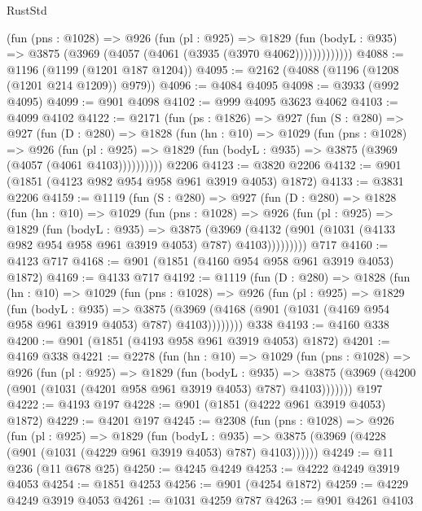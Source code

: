 \begin{lexlean}{RustStd}
\begin{coremodule}
              (fun (pns : @1028) =>
              @926
                (fun (pl : @925) =>
                @1829
                  (fun (bodyL : @935) => @3875 (@3969 (@4057 (@4061 (@3935 (@3970 @4062)))))))))))))
@4088 := @1196 (@1199 (@1201 @187 @1204))
@4095 := @2162 (@4088 (@1196 (@1208 (@1201 @214 @1209)) @979))
@4096 := @4084 @4095
@4098 := @3933 (@992 @4095)
@4099 := @901 @4098
@4102 := @999 @4095 @3623 @4062
@4103 := @4099 @4102
@4122 := @2171
    (fun (ps : @1826) =>
    @927
      (fun (S : @280) =>
      @927
        (fun (D : @280) =>
        @1828
          (fun (hn : @10) =>
          @1029
            (fun (pns : @1028) =>
            @926
              (fun (pl : @925) =>
              @1829 (fun (bodyL : @935) => @3875 (@3969 (@4057 (@4061 @4103))))))))))
    @2206
@4123 := @3820 @2206
@4132 := @901 (@1851 (@4123 @982 @954 @958 @961 @3919 @4053) @1872)
@4133 := @3831 @2206
@4159 := @1119
    (fun (S : @280) =>
    @927
      (fun (D : @280) =>
      @1828
        (fun (hn : @10) =>
        @1029
          (fun (pns : @1028) =>
          @926
            (fun (pl : @925) =>
            @1829
              (fun (bodyL : @935) =>
              @3875
                (@3969
                  (@4132 (@901 (@1031 (@4133 @982 @954 @958 @961 @3919 @4053) @787) @4103)))))))))
    @717
@4160 := @4123 @717
@4168 := @901 (@1851 (@4160 @954 @958 @961 @3919 @4053) @1872)
@4169 := @4133 @717
@4192 := @1119
    (fun (D : @280) =>
    @1828
      (fun (hn : @10) =>
      @1029
        (fun (pns : @1028) =>
        @926
          (fun (pl : @925) =>
          @1829
            (fun (bodyL : @935) =>
            @3875 (@3969 (@4168 (@901 (@1031 (@4169 @954 @958 @961 @3919 @4053) @787) @4103))))))))
    @338
@4193 := @4160 @338
@4200 := @901 (@1851 (@4193 @958 @961 @3919 @4053) @1872)
@4201 := @4169 @338
@4221 := @2278
    (fun (hn : @10) =>
    @1029
      (fun (pns : @1028) =>
      @926
        (fun (pl : @925) =>
        @1829
          (fun (bodyL : @935) =>
          @3875 (@3969 (@4200 (@901 (@1031 (@4201 @958 @961 @3919 @4053) @787) @4103)))))))
    @197
@4222 := @4193 @197
@4228 := @901 (@1851 (@4222 @961 @3919 @4053) @1872)
@4229 := @4201 @197
@4245 := @2308
    (fun (pns : @1028) =>
    @926
      (fun (pl : @925) =>
      @1829
        (fun (bodyL : @935) =>
        @3875 (@3969 (@4228 (@901 (@1031 (@4229 @961 @3919 @4053) @787) @4103))))))
@4249 := @11 @236 (@11 @678 @25)
@4250 := @4245 @4249
@4253 := @4222 @4249 @3919 @4053
@4254 := @1851 @4253
@4256 := @901 (@4254 @1872)
@4259 := @4229 @4249 @3919 @4053
@4261 := @1031 @4259 @787
@4263 := @901 @4261 @4103

\end{coremodule}
\end{lexlean}
